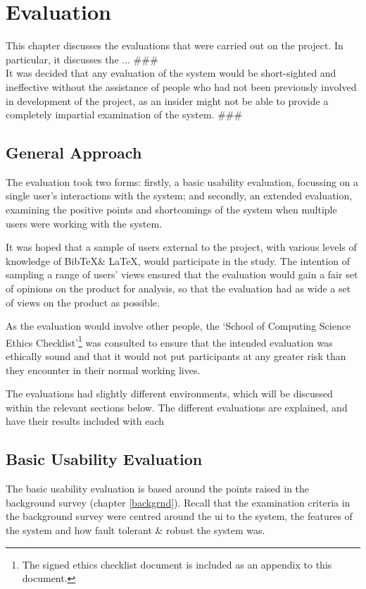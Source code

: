 \documentclass{l4proj}
\newcommand{\BibTeX}{B{\sc ib}\TeX}
\newcommand{\bibtex}{\BibTeX}
\newcommand{\revisit}{\#\#\#}
\begin{document}
\chapter{Evaluation}
\label{eval}
This chapter discusses the evaluations that were carried out on the project.  In particular, it discusses the ... \revisit \\

It was decided that any evaluation of the system would be short-sighted and ineffective without the assistance of people who had not been previously involved in development of the project, as an insider might not be able to provide a completely impartial examination of the system. \revisit

\section{General Approach}
The evaluation took two forms: firstly, a basic usability evaluation, focussing on a single user's interactions with the system; and secondly, an extended evaluation, examining the positive points and shortcomings of the system when multiple users were working with the system.

It was hoped that a sample of users external to the project, with various levels of knowledge of \bibtex \& \LaTeX, would participate in the study. The intention of sampling a range of users' views ensured that the evaluation would gain a fair set of opinions on the product for analysis, so that the evaluation had as wide a set of views on the product as possible. 

As the evaluation would involve other people, the `School of Computing Science Ethics Checklist'\footnote{The signed ethics checklist document is included as an appendix to this document.} was consulted to ensure that the intended evaluation was ethically sound and that it would not put participants at any greater risk than they encounter in their normal working lives.

The evaluations had slightly different environments, which will be discussed within the relevant sections below.  The different evaluations are explained, and have their results included with each 

\section{Basic Usability Evaluation}
The basic usability evaluation is based around the points raised in the background survey (chapter \ref{backgrnd}).  Recall that the examination criteria in the background survey were centred around the \gls{ui} to the system, the features of the system and how fault tolerant \& robust the system was.
\end{document}

